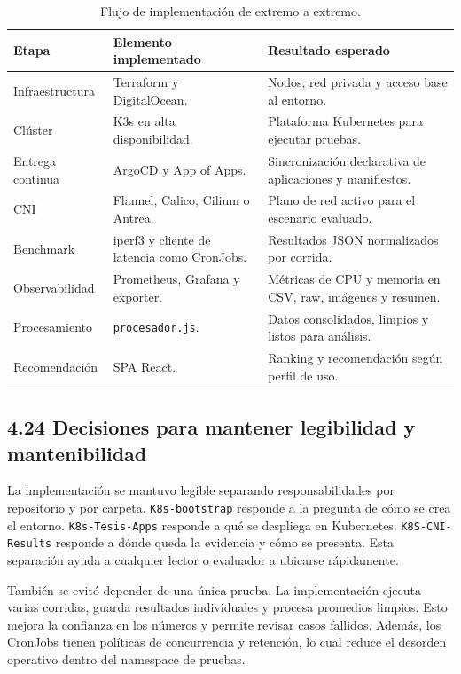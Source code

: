 \documentclass[journal]{IEEEtran}
\begin{document}
\begin{table}[htbp]
\centering
\scriptsize
\caption{Flujo de implementación de extremo a extremo.}
\label{tab:flujo-implementacion}
\begin{tabularx}{\textwidth}{|Y|Y|Y|}
\hline
\textbf{Etapa} & \textbf{Elemento implementado} & \textbf{Resultado esperado} \\
\hline
Infraestructura & Terraform y DigitalOcean. & Nodos, red privada y acceso base al entorno. \\
\hline
Clúster & K3s en alta disponibilidad. & Plataforma Kubernetes para ejecutar pruebas. \\
\hline
Entrega continua & ArgoCD y App of Apps. & Sincronización declarativa de aplicaciones y manifiestos. \\
\hline
CNI & Flannel, Calico, Cilium o Antrea. & Plano de red activo para el escenario evaluado. \\
\hline
Benchmark & iperf3 y cliente de latencia como CronJobs. & Resultados JSON normalizados por corrida. \\
\hline
Observabilidad & Prometheus, Grafana y exporter. & Métricas de CPU y memoria en CSV, raw, imágenes y resumen. \\
\hline
Procesamiento & \texttt{procesador.js}. & Datos consolidados, limpios y listos para análisis. \\
\hline
Recomendación & SPA React. & Ranking y recomendación según perfil de uso. \\
\hline
\end{tabularx}
\end{table}

\subsection{4.24 Decisiones para mantener legibilidad y mantenibilidad}

La implementación se mantuvo legible separando responsabilidades por repositorio y por carpeta. \texttt{K8s-bootstrap} responde a la pregunta de cómo se crea el entorno. \texttt{K8s-Tesis-Apps} responde a qué se despliega en Kubernetes. \texttt{K8S-CNI-Results} responde a dónde queda la evidencia y cómo se presenta. Esta separación ayuda a cualquier lector o evaluador a ubicarse rápidamente.

También se evitó depender de una única prueba. La implementación ejecuta varias corridas, guarda resultados individuales y procesa promedios limpios. Esto mejora la confianza en los números y permite revisar casos fallidos. Además, los CronJobs tienen políticas de concurrencia y retención, lo cual reduce el desorden operativo dentro del namespace de pruebas.
\end{document}
